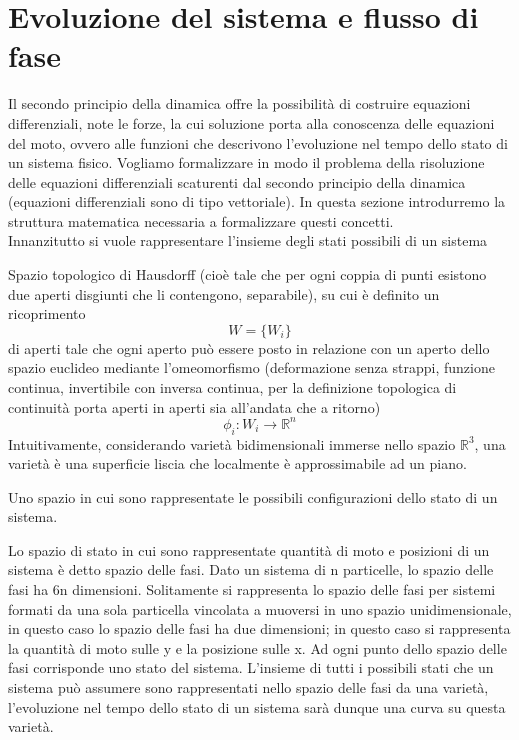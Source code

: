 \documentclass[
10pt, %
a4paper, %
oneside, %
headinclude,footinclude, %
BCOR5mm, %
]{scrartcl}
\begin{document}
\section{Evoluzione del sistema e flusso di fase}
Il secondo principio della dinamica offre la possibilità di costruire equazioni differenziali, note le forze, la cui soluzione porta alla conoscenza delle equazioni del moto, ovvero alle funzioni che descrivono l'evoluzione nel tempo dello stato di un sistema fisico. Vogliamo formalizzare in modo il problema della risoluzione delle equazioni differenziali scaturenti dal secondo principio della dinamica (equazioni differenziali sono di tipo vettoriale). In questa sezione introdurremo la struttura matematica necessaria a formalizzare questi concetti.\\
Innanzitutto si vuole rappresentare l'insieme degli stati possibili di un sistema
\begin{definizione}[Varietà]
Spazio topologico di Hausdorff (cioè tale che per ogni coppia di punti esistono due aperti disgiunti che li contengono, separabile), su cui è definito un ricoprimento \[W = \{W_i\}\] di aperti tale che ogni aperto può essere posto in relazione con un aperto dello spazio euclideo mediante l'omeomorfismo (deformazione senza strappi, funzione continua, invertibile con inversa continua, per la definizione topologica di continuità porta aperti in aperti sia all'andata che a ritorno) \[\phi_i:W_i\rightarrow \mathbb{R}^n\] Intuitivamente, considerando varietà bidimensionali immerse nello spazio \(\mathbb{R}^3\), una varietà è una superficie liscia che localmente è approssimabile ad un piano.\\
\end{definizione}
\begin{definizione}
	Uno spazio in cui sono rappresentate le possibili configurazioni dello stato di un sistema. 
\end{definizione}
\begin{definizione}
	Lo spazio di stato in cui sono rappresentate quantità di moto e posizioni di un sistema è detto spazio delle fasi. Dato un sistema di n particelle, lo spazio delle fasi ha 6n dimensioni. Solitamente si rappresenta lo spazio delle fasi per sistemi formati da una sola particella vincolata a muoversi in uno spazio unidimensionale, in questo caso lo spazio delle fasi ha due dimensioni; in questo caso si rappresenta la quantità di moto sulle y e la posizione sulle x. Ad ogni punto dello spazio delle fasi corrisponde uno stato del sistema. L'insieme di tutti i possibili stati che un sistema può assumere sono rappresentati nello spazio delle fasi da una varietà, l'evoluzione nel tempo dello stato di un sistema sarà dunque una curva su questa varietà.
\end{definizione}
\end{document}
